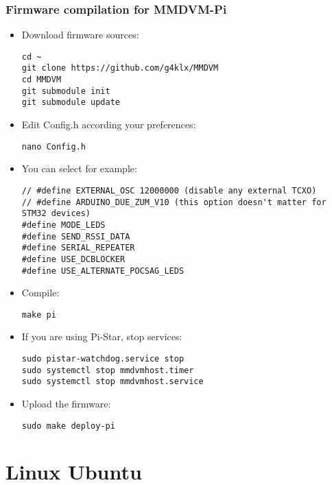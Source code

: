 \documentclass[]{article}
\begin{document}
\subsubsection{Firmware compilation for MMDVM-Pi}

\begin{itemize}[leftmargin=*]
	
\item Download firmware sources:
\begin{lstlisting}[style=DOS]
cd ~
git clone https://github.com/g4klx/MMDVM
cd MMDVM
git submodule init
git submodule update
\end{lstlisting}

\item Edit Config.h according your preferences:
\begin{lstlisting}[style=DOS]
nano Config.h
\end{lstlisting}

\item You can select for example:

\begin{verbatim}
// #define EXTERNAL_OSC 12000000 (disable any external TCXO)
// #define ARDUINO_DUE_ZUM_V10 (this option doesn't matter for STM32 devices)
#define MODE_LEDS
#define SEND_RSSI_DATA
#define SERIAL_REPEATER
#define USE_DCBLOCKER
#define USE_ALTERNATE_POCSAG_LEDS
\end{verbatim}

\item Compile:
\begin{lstlisting}[style=DOS]
make pi
\end{lstlisting}

\item If you are using Pi-Star, stop services:

\begin{lstlisting}[style=DOS]
sudo pistar-watchdog.service stop
sudo systemctl stop mmdvmhost.timer
sudo systemctl stop mmdvmhost.service
\end{lstlisting}

\item Upload the firmware:
\begin{lstlisting}[style=DOS]
sudo make deploy-pi
\end{lstlisting}

\end{itemize}

\section{Linux Ubuntu}
\end{document}
